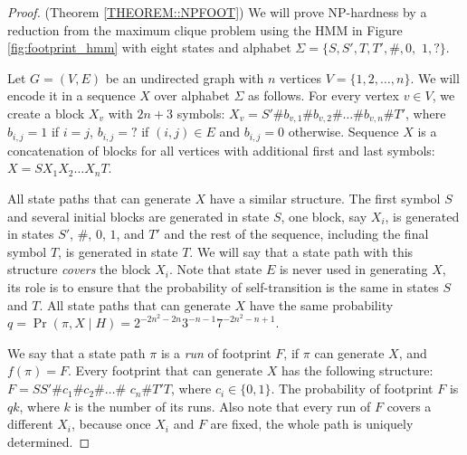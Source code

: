 
\begin{proof}(Theorem \ref{THEOREM::NPFOOT})
We will prove NP-hardness by a reduction from the maximum clique problem
using the HMM in Figure 
\ref{fig:footprint_hmm} with eight states and
alphabet $\Sigma=\{S, S', T, T', \#, 0,$ $1, ?\}$. 

Let $G=(V,E)$ be an undirected graph with $n$ vertices $V=\{1,2,\dots,n\}$. We
will encode it in a sequence $X$ over alphabet $\Sigma$ as follows.  For every
vertex $v\in V$, we create a block $X_v$ with $2n+3$ symbols:
$X_v=S'\#b_{v,1}\#b_{v,2}\#\dots\#b_{v,n}\#T'$, where $b_{i,j}=1$ if $i=j$,
$b_{i,j}=?$ if $(i,j)\in E$ and $b_{i,j}=0$ otherwise.  Sequence $X$ is a
concatenation of blocks for all vertices with additional first and last symbols:
$X=SX_1X_2\dots X_nT$.

All state paths that can generate $X$ have a similar structure. The first
symbol $S$ and several initial blocks are generated in state $S$, one
block, say $X_i$, is generated in states $S'$, $\#$, $0$, $1$, and
$T'$ and the rest of the sequence, including the final symbol $T$, is
generated in state $T$. We will say that a state path with this
structure \emph{covers} the block $X_i$.  Note that state $E$ is never used in
generating $X$, its role is to ensure that the probability of
self-transition is the same in states $S$ and $T$.
All state paths that can generate $X$ have the same
probability $q = \Pr(\pi,X\mid H) = 2^{-2n^2-2n}3^{-n-1}7^{-2n^2-n+1}$.

%


We say that a state path $\pi$ is a \emph{run} of footprint $F$, if
$\pi$ can generate $X$, and $f(\pi)=F$.
Every footprint that can generate $X$ has the following structure:
$F=SS'\#c_1\#c_2\#\dots\#$ $c_n\#T'T$, where $c_i\in\{0,1\}$. 
The probability of footprint $F$ is $qk$, where $k$ is the number of its runs.
Also note that every run of $F$ covers a different $X_i$, because once $X_i$
and $F$ are fixed, the whole path is uniquely determined. 


\end{proof}
